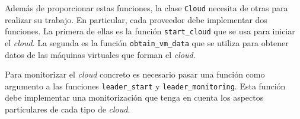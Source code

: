 Además de proporcionar estas funciones, la clase \texttt{Cloud} necesita de otras para realizar su trabajo. En particular, cada proveedor debe implementar dos funciones. La primera de ellas es la función \texttt{start\_cloud} que se usa para iniciar el \emph{cloud}. La segunda es la función \texttt{obtain\_vm\_data} que se utiliza para obtener datos de las máquinas virtuales que forman el \emph{cloud}.

Para monitorizar el \emph{cloud} concreto es necesario pasar una función como argumento a las funciones \texttt{leader\_start} y \texttt{leader\_monitoring}. Esta función debe implementar una monitorización que tenga en cuenta los aspectos particulares de cada tipo de \emph{cloud}.

